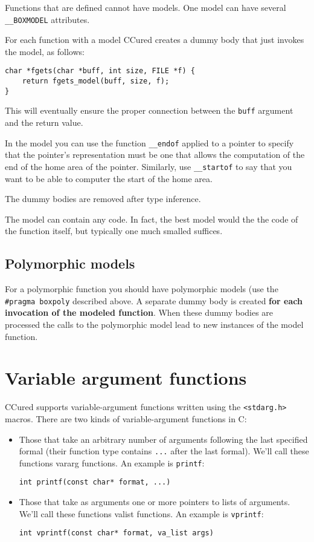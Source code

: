 \documentclass{book}
\def\t#1{{\tt #1}}
\begin{document}
 Functions that are defined cannot have models. One model can have several
 \t{\_\_BOXMODEL} attributes. 

 For each function with a model CCured creates a dummy body that just invokes
 the model, as follows: 

\begin{verbatim}
char *fgets(char *buff, int size, FILE *f) {
    return fgets_model(buff, size, f);
}
\end{verbatim}

 This will eventually ensure the proper connection between the \t{buff}
argument and the return value. 

 In the model you can use the function \t{\_\_endof} applied to a pointer to
specify that the pointer's representation must be one that allows the
computation of the end of the home area of the pointer. Similarly, use
\t{\_\_startof} to say that you want to be able to computer the start of the
home area. 

 The dummy bodies are removed after type inference. 

 The model can contain any code. In fact, the best model would the the code of
 the function itself, but typically one much smalled suffices.

     \subsection{Polymorphic models}

 For a polymorphic function you should have polymorphic models (use the
\t{\#pragma boxpoly} described above. A separate dummy body is created {\bf for
each invocation of the modeled function}. When these dummy bodies are
processed the calls to the polymorphic model lead to new instances of the
model function. 
 

       \section{Variable argument functions}\label{sec-vararg}

 CCured supports variable-argument functions written using the \t{<stdarg.h>}
macros. There are two kinds of variable-argument functions in C: 
\begin{itemize}
\item Those that take an arbitrary number of arguments following the last
specified formal (their function type contains \t{...} after the last formal).
We'll call these functions vararg functions. An example is \t{printf}:
\begin{verbatim}
int printf(const char* format, ...)
\end{verbatim}

\item Those that take as arguments one or more pointers to lists of
arguments. We'll call these functions valist functions. An example is
\t{vprintf}:
\begin{verbatim}
int vprintf(const char* format, va_list args)
\end{verbatim}
\end{itemize}
\end{document}
